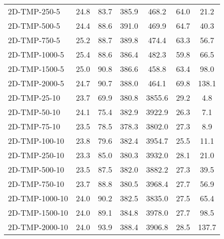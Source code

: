 \documentclass{article}
\begin{document}
\begin{table}[h]
\begin{center}
\begin{tabular}{|l||c|c|c|c|c|c|}
            2D-TMP-250-5                   & 24.8      & 83.7       & 385.9       & 468.2    & 64.0      & 21.2       \\
            2D-TMP-500-5                   & 24.4      & 88.6       & 391.0       & 469.9    & 64.7      & 40.3       \\
            2D-TMP-750-5                   & 25.2      & 88.7       & 389.8       & 474.4    & 63.3      & 56.7       \\
            2D-TMP-1000-5                  & 25.4      & 88.6       & 386.4       & 482.3    & 59.8      & 66.5       \\
            2D-TMP-1500-5                  & 25.0      & 90.8       & 386.6       & 458.8    & 63.4      & 98.0       \\
            2D-TMP-2000-5                  & 24.7      & 90.7       & 388.0       & 464.1    & 69.8      & 138.1      \\
            \hline
            2D-TMP-25-10                   & 23.7      & 69.9       & 380.8       & 3855.6   & 29.2      & 4.8        \\
            2D-TMP-50-10                   & 24.1      & 75.4       & 382.9       & 3922.9   & 26.3      & 7.1        \\
            2D-TMP-75-10                   & 23.5      & 78.5       & 378.3       & 3802.0   & 27.3      & 8.9        \\
            2D-TMP-100-10                  & 23.8      & 79.6       & 382.4       & 3954.7   & 25.5      & 11.1       \\
            2D-TMP-250-10                  & 23.3      & 85.0       & 380.3       & 3932.0   & 28.1      & 21.0       \\
            2D-TMP-500-10                  & 23.5      & 87.5       & 382.0       & 3882.2   & 27.3      & 39.5       \\
            2D-TMP-750-10                  & 23.7      & 88.8       & 380.5       & 3968.4   & 27.7      & 56.9       \\
            2D-TMP-1000-10                 & 24.0      & 90.2       & 382.5       & 3835.0   & 27.5      & 65.4       \\
            2D-TMP-1500-10                 & 24.0      & 89.1       & 384.8       & 3978.0   & 27.7      & 98.5       \\
            2D-TMP-2000-10                 & 24.0      & 93.9       & 388.4       & 3906.8   & 28.5      & 137.7      \\
            \hline

\end{tabular}
\end{center}
\end{table}
\end{document}
